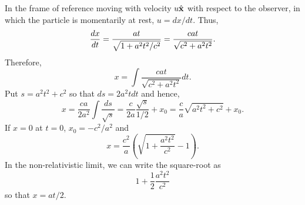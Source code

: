 \begin{enumerate}
In the frame of reference moving with velocity $u\hat{\mathbf{x}}$ with respect to the 
observer, in which the particle is momentarily at rest, $u = dx/dt$. Thus,
\[
\frac{d{x}}{d{t}} = \frac{at}{\sqrt{1 + a^2t^2/c^2}} = \frac{cat}{\sqrt{c^2 + a^2t^2}}.
\]
Therefore,
\[
x = \int \frac{cat}{\sqrt{c^2 + a^2t^2}}dt.
\]
Put $s = a^2t^2 + c^2$ so that $ds = 2a^2tdt$ and hence,
\[
x = \frac{ca}{2a^2} \int \frac{ds}{\sqrt{s}} = \frac{c}{2a}\frac{\sqrt{s}}{1/2} + x_0
= \frac{c}{a}\sqrt{a^2t^2 + c^2} + x_0.
\] 
If $x = 0$ at $t = 0$, $x_0 = -c^2/a^2$ and 
\begin{equation}\label{c1e102}
x = \frac{c^2}{a}\left(\sqrt{1 + \frac{a^2t^2}{c^2}} - 1\right).
\end{equation}
In the non-relativistic limit, we can write the square-root as 
\[
1 + \frac{1}{2}\frac{a^2t^2}{c^2}
\]
so that $x = at/2$.

\end{enumerate}
